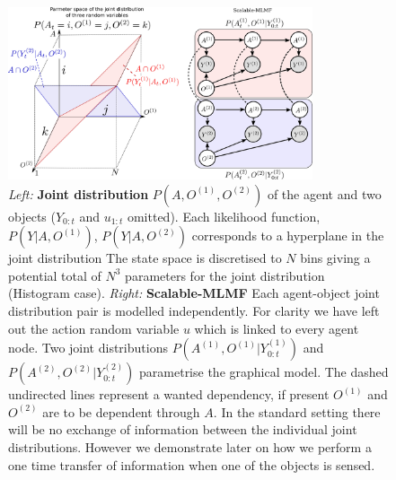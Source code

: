 \documentclass{frontiersSCNS} %
\begin{document}
\begin{figure}
 \centering
  \includegraphics[width=0.8\textwidth]{Figure8}
  \caption{\textit{Left:} \textbf{Joint distribution} $P(A,O^{(1)},O^{(2)})$ of the agent and two objects ($Y_{0:t}$ and $u_{1:t}$ omitted). Each 
  likelihood function, $P(Y|A,O^{(1)})$, $P(Y|A,O^{(2)})$ corresponds to a hyperplane in the joint distribution
  The state space is discretised to $N$ bins giving a potential total of $N^3$  parameters for the joint distribution (Histogram case). 
  \textit{Right:} \textbf{Scalable-MLMF} Each agent-object joint distribution pair is modelled independently. For clarity we have left 
  out the action random variable $u$ which is linked to every agent node.
  Two joint distributions $P(A^{(1)},O^{(1)}|Y^{(1)}_{0:t})$   and $P(A^{(2)},O^{(2)}|Y^{(2)}_{0:t})$ parametrise the graphical model. 
  The dashed undirected lines represent a wanted dependency, if present $O^{(1)}$ and $O^{(2)}$ are to be dependent through $A$. In
  the standard setting there will be no exchange of information between the individual joint distributions. However we demonstrate later on how
  we perform a one time transfer of information when one of the objects is sensed.}
  \label{fig:3bel_lik_profile}
\end{figure}
\end{document}
